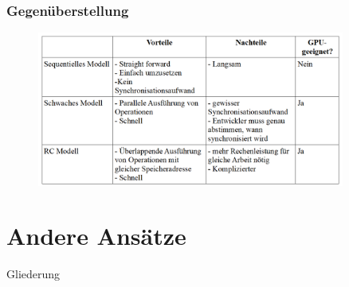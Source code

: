 \documentclass{sikslides}
\begin{document}
\begin{frame}
	\frametitle{Gegenüberstellung}
\begin{figure}[htbp] 
  \centering
  \includegraphics[width=0.9\textwidth]{figures/vergleich.png}
  \label{Fig:vg}
\end{figure}

\end{frame}

\section{Andere Ansätze}

\begin{frame}{Gliederung}
   
    	\tableofcontents[currentsection, subsectionstyle=show/show/hide]
\end{frame}
\end{document}
